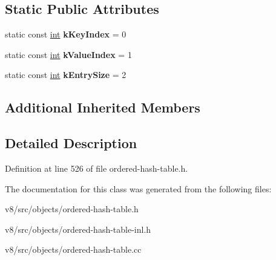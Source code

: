 \subsection*{Static Public Attributes}
\begin{DoxyCompactItemize}
\item 
\mbox{\label{classv8_1_1internal_1_1SmallOrderedHashMap_a5e2369879e4be395bee74c2f624eefa7}} 
static const \mbox{\hyperlink{classint}{int}} {\bfseries k\+Key\+Index} = 0
\item 
\mbox{\label{classv8_1_1internal_1_1SmallOrderedHashMap_a9deaee3fecd6617641ab689445a6d0d0}} 
static const \mbox{\hyperlink{classint}{int}} {\bfseries k\+Value\+Index} = 1
\item 
\mbox{\label{classv8_1_1internal_1_1SmallOrderedHashMap_aa01ba7cd8e778867116f855ce57589e2}} 
static const \mbox{\hyperlink{classint}{int}} {\bfseries k\+Entry\+Size} = 2
\end{DoxyCompactItemize}
\subsection*{Additional Inherited Members}


\subsection{Detailed Description}


Definition at line 526 of file ordered-\/hash-\/table.\+h.



The documentation for this class was generated from the following files\+:\begin{DoxyCompactItemize}
\item 
v8/src/objects/ordered-\/hash-\/table.\+h\item 
v8/src/objects/ordered-\/hash-\/table-\/inl.\+h\item 
v8/src/objects/ordered-\/hash-\/table.\+cc\end{DoxyCompactItemize}
